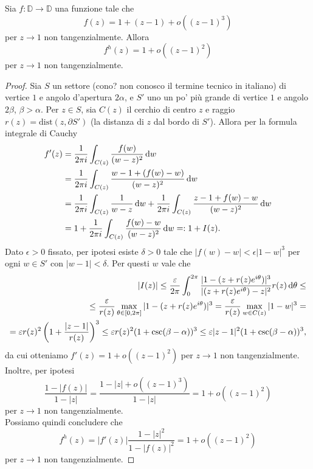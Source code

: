 
\begin{prop} \label{o^3->o^2}
  Sia $f:\mathbb{D} \longrightarrow \mathbb{D}$ una funzione tale che
  \begin{equation} \label{o^3}
    f(z)=1+(z-1)+o((z-1)^3)
  \end{equation}
  per $z \longrightarrow 1$ non tangenzialmente. Allora
  \begin{equation} \label{o^2}
    f^h(z)=1+o((z-1)^2)
  \end{equation}
  per $z \longrightarrow 1$ non tangenzialmente.
\end{prop}

\begin{proof}
  Sia $S$ un settore (cono? non conosco il termine tecnico in italiano) di vertice $1$ e angolo d'apertura $2\alpha$, e $S'$ uno un po' più grande di vertice $1$ e angolo $2\beta$, $\beta>\alpha$. Per $z \in S$, sia $C(z)$ il cerchio di centro $z$ e raggio $r(z)=\text{dist}(z, \partial S')$ (la distanza di $z$ dal bordo di $S'$). Allora per la formula integrale di Cauchy
  \begin{align*}
    f'(z) & =\frac{1}{2\pi i} \int_{C(z)} \frac{f(w)}{(w-z)^2}\mathop{}\!\mathrm{d} w \\
    & =\frac{1}{2\pi i} \int_{C(z)} \frac{w-1+(f(w)-w)}{(w-z)^2}\mathop{}\!\mathrm{d} w \\
    & =\frac{1}{2\pi i} \int_{C(z)} \frac{1}{w-z}\mathop{}\!\mathrm{d} w+\frac{1}{2\pi i} \int_{C(z)} \frac{z-1+f(w)-w}{(w-z)^2}\mathop{}\!\mathrm{d} w \\
    & =1+\frac{1}{2\pi i} \int_{C(z)} \frac{f(w)-w}{(w-z)^2}\mathop{}\!\mathrm{d} w=:1+I(z).
  \end{align*}
  Dato $\epsilon>0$ fissato, per ipotesi esiste $\delta>0$ tale che $|f(w)-w|<\epsilon|1-w|^3$ per ogni $w \in S'$ con $|w-1|<\delta$. Per questi $w$ vale che
  \begin{align*}
    |I(z)| \le \frac{\varepsilon}{2\pi} \int_0^{2\pi} \frac{|1-(z+r(z)e^{i\theta})|^3}{|(z+r(z)e^{i\theta})-z|^2}r(z)\mathop{}\!\mathrm{d}\theta \le \\
    \le \frac{\varepsilon}{r(z)}\max_{\theta \in [0,2\pi]} |1-(z+r(z)e^{i\theta})|^3=\frac{\varepsilon}{r(z)}\max_{w \in C(z)}|1-w|^3= \\
    =\varepsilon r(z)^2\left(1+\frac{|z-1|}{r(z)}\right)^3 \le \varepsilon r(z)^2(1+\csc(\beta-\alpha))^3 \le \varepsilon |z-1|^2(1+\csc(\beta-\alpha))^3,
  \end{align*}
  da cui otteniamo $f'(z)=1+o((z-1)^2)$ per $z \longrightarrow 1$ non tangenzialmente. Inoltre, per ipotesi
  $$\frac{1-|f(z)|}{1-|z|}=\frac{1-|z|+o((z-1)^3)}{1-|z|}=1+o((z-1)^2)$$
  per $z \longrightarrow 1$ non tangenzialmente. \\
  Possiamo quindi concludere che
  $$f^h(z)=|f'(z)|\frac{1-|z|^2}{1-|f(z)|^2}=1+o((z-1)^2)$$
  per $z \longrightarrow 1$ non tangenzialmente.
\end{proof}

